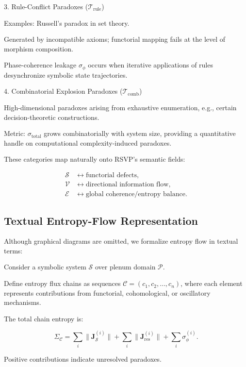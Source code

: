 \documentclass[12pt]{article}
\theoremstyle{plain}
\begin{document}
3. Rule-Conflict Paradoxes (\(\mathcal{T}_\text{rule}\))

Examples: Russell’s paradox in set theory.

Generated by incompatible axioms; functorial mapping fails at the level of morphism composition.

Phase-coherence leakage \(\sigma_\phi\) occurs when iterative applications of rules desynchronize symbolic state trajectories.

4. Combinatorial Explosion Paradoxes (\(\mathcal{T}_\text{comb}\))

High-dimensional paradoxes arising from exhaustive enumeration, e.g., certain decision-theoretic constructions.

Metric: \(\sigma_{\mathrm{total}}\) grows combinatorially with system size, providing a quantitative handle on computational complexity-induced paradoxes.

These categories map naturally onto RSVP’s semantic fields:

\begin{align*}
\mathcal{S} &\longleftrightarrow \text{functorial defects},\\
\mathcal{V} &\longleftrightarrow \text{directional information flow},\\
\mathcal{E} &\longleftrightarrow \text{global coherence/entropy balance}.
\end{align*}

\subsection{Textual Entropy-Flow Representation}

Although graphical diagrams are omitted, we formalize entropy flow in textual terms:

Consider a symbolic system \(\mathcal{S}\) over plenum domain \(\mathcal{P}\).

Define entropy flux chains as sequences \(\mathcal{C} = (c_1, c_2, \dots, c_n)\), where each element represents contributions from functorial, cohomological, or oscillatory mechanisms.

The total chain entropy is:

\begin{equation}
\Sigma_\mathcal{C} = \sum_i \|\mathbf{J}_\mathcal{S}^{(i)}\| + \sum_i \|\mathbf{J}_{\mathrm{res}}^{(i)}\| + \sum_i \sigma_\phi^{(i)}.
\end{equation}

Positive contributions indicate unresolved paradoxes.
\end{document}

